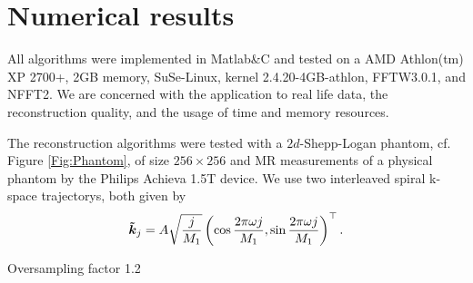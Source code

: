 \documentclass[journal]{IEEEtran}
\newcommand{\zb}[1]{\mbox{\boldmath{${#1}$}}}
\numberwithin{equation}{section}
\numberwithin{table}{section}
\numberwithin{figure}{section}
\begin{document}
\section{Numerical results}\label{Sec:Num}
All algorithms were implemented in Matlab\&C and tested on a AMD Athlon(tm) XP
2700+, 2GB memory, SuSe-Linux, kernel 2.4.20-4GB-athlon, FFTW3.0.1, and NFFT2.
We are concerned with the application to real life data, the reconstruction
quality, and the usage of time and memory resources.

The reconstruction algorithms were tested with a $2d$-Shepp-Logan phantom, cf. Figure \ref{Fig:Phantom}, of size $256\times256$ and MR measurements of a physical phantom by the Philips Achieva 1.5T device. We use two interleaved spiral k-space trajectorys, both given by
\begin{equation*}
\zb {\tilde k}_j = A \sqrt{\frac{j}{M_1}} \left(\cos\frac{2\pi \omega
    j}{M_1}, \sin\frac{2\pi \omega j}{M_1}\right)^{\top}. 
\end{equation*}


Oversampling factor 1.2
\end{document}
